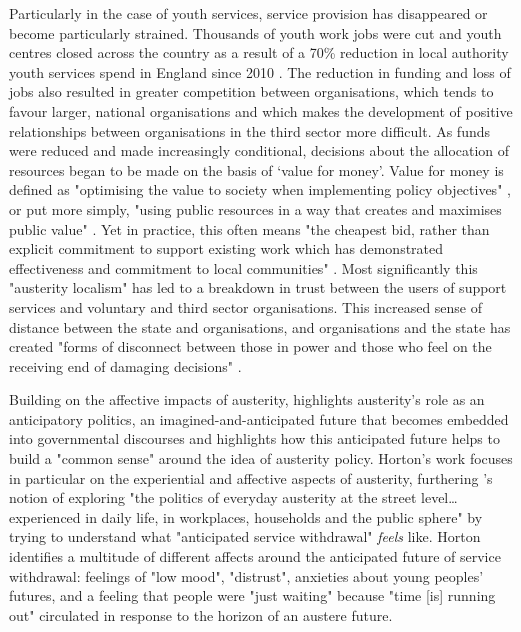 Particularly in the case of youth services, service provision has disappeared or become particularly strained. Thousands of youth work jobs were cut and youth centres closed across the country as a result of a 70\% reduction in local authority youth services spend in England since 2010 \citep[p. 9]{ymca_making_2020}. The reduction in funding and loss of jobs also resulted in greater competition between organisations, which tends to favour larger, national organisations and which makes the development of positive relationships between organisations in the third sector more difficult. As funds were reduced and made increasingly conditional, decisions about the allocation of resources began to be made on the basis of `value for money'. Value for money is defined as "optimising the value to society when implementing policy objectives" \citep[p. 2]{h_m_treasury_green_2022}, or put more simply, "using public resources in a way that creates and maximises public value" \citep[p. 6]{department_for_transport_value_2015}. Yet in practice, this often means "the cheapest bid, rather than explicit commitment to support existing work which has demonstrated effectiveness and commitment to local communities" \citep[p. 732]{clayton_distancing_2016}. Most significantly this "austerity localism" has led to a breakdown in trust between the users of support services and voluntary and third sector organisations. This increased sense of distance between the state and organisations, and organisations and the state has created "forms of disconnect between those in power and those who feel on the receiving end of damaging decisions" \citep[p. 737]{clayton_distancing_2016}.

Building on the affective impacts of austerity, \citet{horton_anticipating_2016} highlights austerity's role as an anticipatory politics, an imagined-and-anticipated future that becomes embedded into governmental discourses and highlights how this anticipated future helps to build a "common sense" around the idea of austerity policy. Horton's work focuses in particular on the experiential and affective aspects of austerity, furthering \citet[p. 632]{peck_austerity_2012}'s notion of exploring "the politics of everyday austerity at the street level\ldots{} experienced in daily life, in workplaces, households and the public sphere" by trying to understand what "anticipated service withdrawal" \emph{feels} like. Horton identifies a multitude of different affects around the anticipated future of service withdrawal: feelings of "low mood", "distrust", anxieties about young peoples' futures, and a feeling that people were "just waiting" because "time [is] running out" circulated in response to the horizon of an austere future. 

